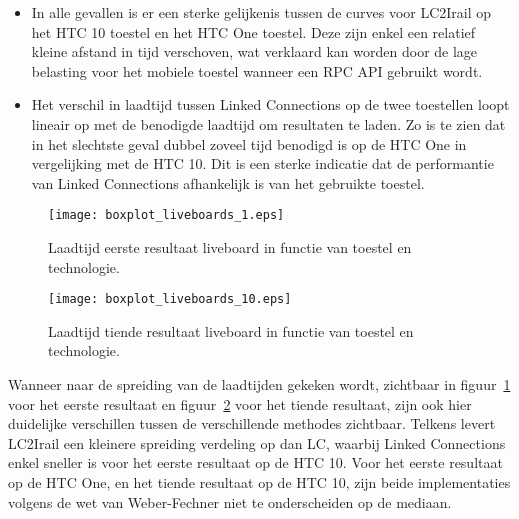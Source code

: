 \begin{itemize}
	\item In alle gevallen is er een sterke gelijkenis tussen de curves voor LC2Irail op het HTC 10 toestel en het HTC One toestel. Deze zijn enkel een relatief kleine afstand in tijd verschoven, wat verklaard kan worden door de lage belasting voor het mobiele toestel wanneer een RPC API gebruikt wordt.

	\item Het verschil in laadtijd tussen Linked Connections op de twee toestellen loopt lineair op met de benodigde laadtijd om resultaten te laden. Zo is te zien dat in het slechtste geval dubbel zoveel tijd benodigd is op de HTC One in vergelijking met de HTC 10. Dit is een sterke indicatie dat de performantie van Linked Connections afhankelijk is van het gebruikte toestel.
\end{itemize}

\begin{figure}[h]
	\centering
	\texttt{[image: boxplot\_liveboards\_1.eps]}
	\caption[Laadtijd eerste resultaat liveboard in functie van toestel en technologie]{Laadtijd eerste resultaat liveboard in functie van toestel en technologie.}
	\label{fig:liveboardsBoxplot1}
\end{figure}

\begin{figure}[h]
	\centering
	\texttt{[image: boxplot\_liveboards\_10.eps]}
	\caption[Laadtijd tiende resultaat liveboard in functie van toestel en technologie]{Laadtijd tiende resultaat liveboard in functie van toestel en technologie.}
	\label{fig:liveboardsBoxplot10}
\end{figure}

Wanneer naar de spreiding van de laadtijden gekeken wordt, zichtbaar in figuur~\ref{fig:liveboardsBoxplot1} voor het eerste resultaat en figuur~\ref{fig:liveboardsBoxplot10} voor het tiende resultaat, zijn ook hier duidelijke verschillen tussen de verschillende methodes zichtbaar. Telkens levert LC2Irail een kleinere spreiding verdeling op dan LC, waarbij Linked Connections enkel sneller is voor het eerste resultaat op de HTC 10. Voor het eerste resultaat op de HTC One, en het tiende resultaat op de HTC 10, zijn beide implementaties volgens de wet van Weber-Fechner niet te onderscheiden op de mediaan.

